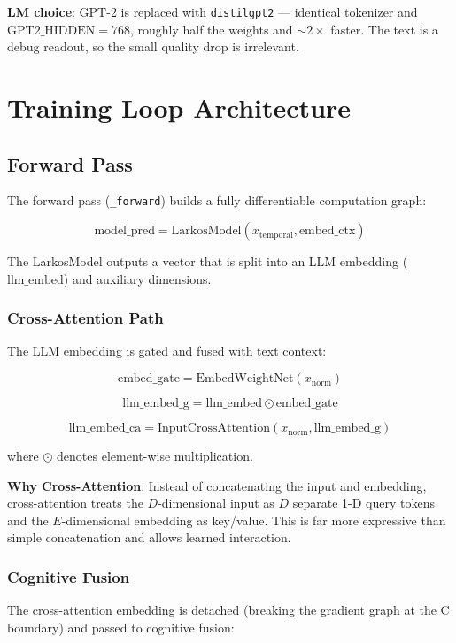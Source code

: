 \documentclass[12pt]{article}
\begin{document}
\textbf{LM choice}: GPT-2 is replaced with \texttt{distilgpt2} —
identical tokenizer and $\text{GPT2\_HIDDEN}=768$, roughly half the
weights and $\sim 2\times$ faster. The text is a debug readout, so the
small quality drop is irrelevant.

\section{Training Loop Architecture}

\subsection{Forward Pass}

The forward pass (\texttt{\_forward}) builds a fully differentiable
computation graph:

\[
  \text{model\_pred} = \text{LarkosModel}(x_{\text{temporal}},
    \text{embed\_ctx})
\]

The LarkosModel outputs a vector that is split into an LLM embedding
($\text{llm\_embed}$) and auxiliary dimensions.

\subsubsection{Cross-Attention Path}

The LLM embedding is gated and fused with text context:

\[
  \text{embed\_gate} = \text{EmbedWeightNet}(x_{\text{norm}})
\]

\[
  \text{llm\_embed\_g} = \text{llm\_embed} \odot \text{embed\_gate}
\]

\[
  \text{llm\_embed\_ca} = \text{InputCrossAttention}(x_{\text{norm}},
    \text{llm\_embed\_g})
\]

where $\odot$ denotes element-wise multiplication.

\textbf{Why Cross-Attention}: Instead of concatenating the input and
embedding, cross-attention treats the $D$-dimensional input as $D$ separate
1-D query tokens and the $E$-dimensional embedding as key/value. This is
far more expressive than simple concatenation and allows learned
interaction.

\subsubsection{Cognitive Fusion}

The cross-attention embedding is detached (breaking the gradient graph at
the C boundary) and passed to cognitive fusion:
\end{document}
